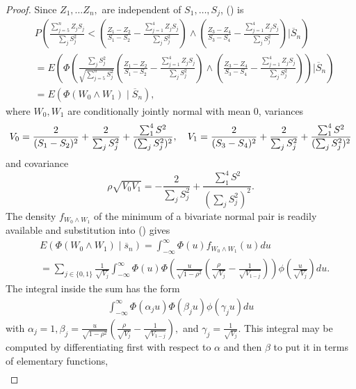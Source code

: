 \documentclass[12pt]{article}
\newcommand{\E}{E}
\renewcommand{\P}{P}
\newcommand{\z}{Z}
\newcommand{\s}{S}
\newcommand{\w}{W}
\newcommand{\svec}{\overline{S}}
\begin{document}
\begin{appendices}
\begin{proof}
    Since $\z_1,\ldots\z_n,$ are independent of $\s_1,\ldots,\s_j$, () is
    \begin{align}
      &\P\left(\frac{\sum_{j=5}^n \z_j\s_j}{\sum_j \s_j^2} < \left(\frac{\z_1-\z_2}{\s_1-\s_2}- \frac{\sum_{j=1}^4\z_j\s_j}{\sum_j\s_j^2}  \right)\wedge \left(\frac{\z_3-\z_4}{\s_3-\s_4}- \frac{\sum_{j=1}^4\z_j\s_j}{\sum_j\s_j^2}\right) \bigg\vert \svec_n\right)\\
      &=\E\left(\Phi\left(\frac{\sum_j\s_j^2}{\sqrt{\sum_{j=5}^n\s_j^2}}\left(\frac{\z_1-\z_2}{\s_1-\s_2}- \frac{\sum_{j=1}^4\z_j\s_j}{\sum_j\s_j^2}  \right)\wedge \left(\frac{\z_3-\z_4}{\s_3-\s_4}- \frac{\sum_{j=1}^4\z_j\s_j}{\sum_j\s_j^2}\right)  \right) \bigg\vert \svec_n\right)\\
      &=\E\left(\Phi(\w_0\wedge \w_1)\mid \svec_n\right),\label{thm1:min_exp}
    \end{align}
    where $\w_0,\w_1$ are conditionally jointly normal with mean $0$, variances
    $$
    V_0=\frac{2}{(\s_1-\s_2)^2} + \frac{2}{\sum_j\s_j^2}+\frac{\sum_{1}^4\s^2}{(\sum_j\s_j^2)^2}, \hspace{10px}    V_1=\frac{2}{(\s_3-\s_4)^2} + \frac{2}{\sum_j\s_j^2}+\frac{\sum_{1}^4\s^2}{(\sum_j\s_j^2)^2}
    $$
    and covariance
    $$
    \rho\sqrt{V_0V_1}=-\frac{2}{\sum_j\s_j^2}+\frac{\sum_{1}^4\s^2}{(\sum_j\s_j^2)^2}.
    $$
    The density $f_{\w_0\wedge \w_1}$ of the minimum of a bivariate normal pair is readily available and substitution into () gives
    \begin{align}
      &\E\left(\Phi(\w_0\wedge \w_1)\mid \overline{s}_n\right) = \int_{-\infty}^{\infty}\Phi(u)f_{\w_0\wedge \w_1}(u)du\\
      &=\sum_{j\in\{0,1\}}\frac{1}{\sqrt{V_j}}\int_{-\infty}^{\infty}\Phi(u)\Phi\left(\frac{u}{\sqrt{1-\rho^2}}\left(\frac{\rho}{\sqrt{V_j}}-\frac{1}{\sqrt{V_{1-j}}}\right) \right)\phi\left(\frac{u}{\sqrt{V_j}}\right)du.
    \end{align}
    The integral inside the sum has the form
    \begin{align}
      \int_{-\infty}^{\infty}\Phi(\alpha_j u)\Phi(\beta_j u)\phi(\gamma_j u)du
    \end{align}
    with $\alpha_j=1,\beta_j=\frac{u}{\sqrt{1-\rho^2}}\left(\frac{\rho}{\sqrt{V_j}}-\frac{1}{\sqrt{V_{1-j}}}\right),$ and $\gamma_j = \frac{1}{\sqrt{V_j}}$. This integral may be computed by differentiating first with respect to $\alpha$ and then $\beta$ to put it in terms of elementary functions,
    \begin{align}

\end{align}
\end{proof}
\end{appendices}
\end{document}
